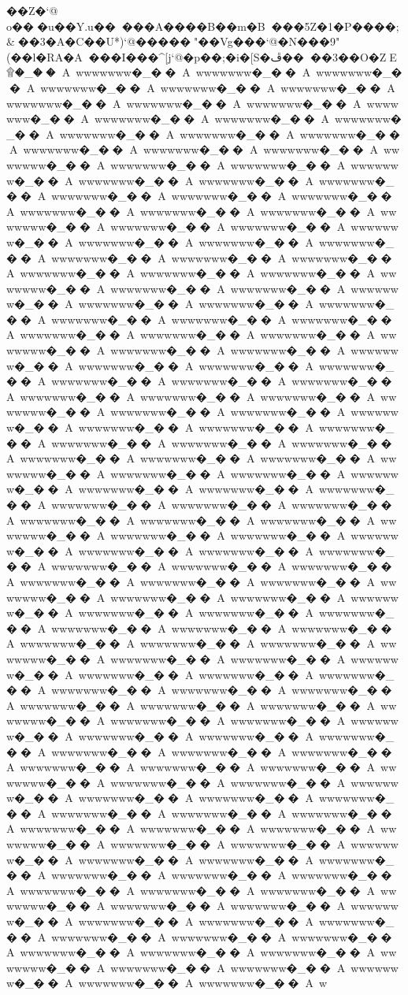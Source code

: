 {{{{{{{{{{{{{{{{{{{{{{{{{{{{{{{{{{{{{{{{{{{{{{{{{{{{{{{{{{{{{{{{{{{{{{{{{{{{{��Z�`@ o���u��Y.u�\�����A����B��m�B���5Z�1�P����;&��3�A�C��U*)`@�����"��Vg���`@�N���9"(��l�RA�A���I�\���^[j`@�p��;�i�[S�ڦ����3��O�ZE۩�_��A~wwwwwww�_��A~wwwwwww�_��A~wwwwwww�_��A~wwwwwww�_��A~wwwwwww�_��A~wwwwwww�_��A~wwwwwww�_��A~wwwwwww�_��A~wwwwwww�_��A~wwwwwww�_��A~wwwwwww�_��A~wwwwwww�_��A~wwwwwww�_��A~wwwwwww�_��A~wwwwwww�_��A~wwwwwww�_��A~wwwwwww�_��A~wwwwwww�_��A~wwwwwww�_��A~wwwwwww�_��A~wwwwwww�_��A~wwwwwww�_��A~wwwwwww�_��A~wwwwwww�_��A~wwwwwww�_��A~wwwwwww�_��A~wwwwwww�_��A~wwwwwww�_��A~wwwwwww�_��A~wwwwwww�_��A~wwwwwww�_��A~wwwwwww�_��A~wwwwwww�_��A~wwwwwww�_��A~wwwwwww�_��A~wwwwwww�_��A~wwwwwww�_��A~wwwwwww�_��A~wwwwwww�_��A~wwwwwww�_��A~wwwwwww�_��A~wwwwwww�_��A~wwwwwww�_��A~wwwwwww�_��A~wwwwwww�_��A~wwwwwww�_��A~wwwwwww�_��A~wwwwwww�_��A~wwwwwww�_��A~wwwwwww�_��A~wwwwwww�_��A~wwwwwww�_��A~wwwwwww�_��A~wwwwwww�_��A~wwwwwww�_��A~wwwwwww�_��A~wwwwwww�_��A~wwwwwww�_��A~wwwwwww�_��A~wwwwwww�_��A~wwwwwww�_��A~wwwwwww�_��A~wwwwwww�_��A~wwwwwww�_��A~wwwwwww�_��A~wwwwwww�_��A~wwwwwww�_��A~wwwwwww�_��A~wwwwwww�_��A~wwwwwww�_��A~wwwwwww�_��A~wwwwwww�_��A~wwwwwww�_��A~wwwwwww�_��A~wwwwwww�_��A~wwwwwww�_��A~wwwwwww�_��A~wwwwwww�_��A~wwwwwww�_��A~wwwwwww�_��A~wwwwwww�_��A~wwwwwww�_��A~wwwwwww�_��A~wwwwwww�_��A~wwwwwww�_��A~wwwwwww�_��A~wwwwwww�_��A~wwwwwww�_��A~wwwwwww�_��A~wwwwwww�_��A~wwwwwww�_��A~wwwwwww�_��A~wwwwwww�_��A~wwwwwww�_��A~wwwwwww�_��A~wwwwwww�_��A~wwwwwww�_��A~wwwwwww�_��A~wwwwwww�_��A~wwwwwww�_��A~wwwwwww�_��A~wwwwwww�_��A~wwwwwww�_��A~wwwwwww�_��A~wwwwwww�_��A~wwwwwww�_��A~wwwwwww�_��A~wwwwwww�_��A~wwwwwww�_��A~wwwwwww�_��A~wwwwwww�_��A~wwwwwww�_��A~wwwwwww�_��A~wwwwwww�_��A~wwwwwww�_��A~wwwwwww�_��A~wwwwwww�_��A~wwwwwww�_��A~wwwwwww�_��A~wwwwwww�_��A~wwwwwww�_��A~wwwwwww�_��A~wwwwwww�_��A~wwwwwww�_��A~wwwwwww�_��A~wwwwwww�_��A~wwwwwww�_��A~wwwwwww�_��A~wwwwwww�_��A~wwwwwww�_��A~wwwwwww�_��A~wwwwwww�_��A~wwwwwww�_��A~wwwwwww�_��A~wwwwwww�_��A~wwwwwww�_��A~wwwwwww�_��A~wwwwwww�_��A~wwwwwww�_��A~wwwwwww�_��A~wwwwwww�_��A~wwwwwww�_��A~wwwwwww�_��A~wwwwwww�_��A~wwwwwww�_��A~wwwwwww�_��A~wwwwwww�_��A~wwwwwww�_��A~wwwwwww�_��A~wwwwwww�_��A~wwwwwww�_��A~wwwwwww�_��A~wwwwwww�_��A~wwwwwww�_��A~wwwwwww�_��A~wwwwwww�_��A~wwwwwww�_��A~wwwwwww�_��A~wwwwwww�_��A~wwwwwww�_��A~wwwwwww�_��A~wwwwwww�_��A~wwwwwww�_��A~wwwwwww�_��A~wwwwwww�_��A~wwwwwww�_��A~wwwwwww�_��A~wwwwwww�_��A~wwwwwww�_��A~wwwwwww�_��A~wwwwwww�_��A~wwwwwww�_��A~wwwwwww�_��A~wwwwwww�_��A~wwwwwww�_��A~wwwwwww�_��A~wwwwwww�_��A~wwwwwww�_��A~wwwwwww�_��A~wwwwwww�_��A~wwwwwww�_��A~wwwwwww�_��A~wwwwwww�_��A~wwwwwww�_��A~wwwwwww�_��A~wwwwwww�_��A~wwwwwww�_��A~wwwwwww�_��A~wwwwwww�_��A~wwwwwww�_��A~wwwwwww�_��A~wwwwwww�_��A~wwwwwww�_��A~wwwwwww�_��A~w}}}}}}}}}}}}}}}}}}}}}}}}}}}}}}}}}}}}}}}}}}}}}}}}}}}}}}}}}}}}}}}}}}}}}}}}}}}}}
